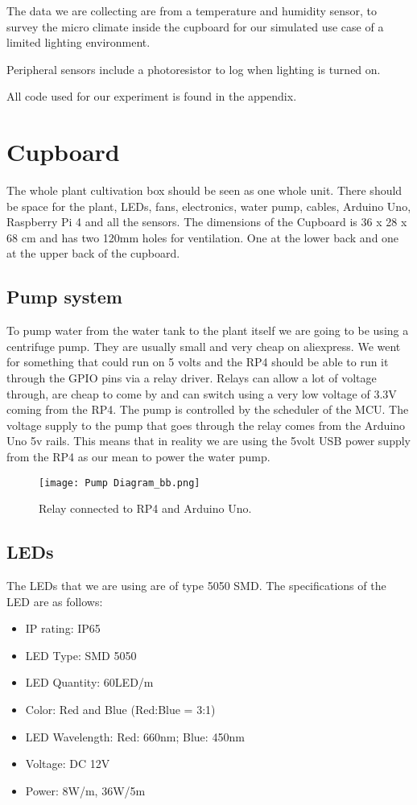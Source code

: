 \documentclass[12pt,a4paper,oneside]{book}
\begin{document}
The data we are collecting are from a temperature and humidity sensor, to survey the micro climate inside the cupboard for our simulated use case of a limited lighting environment.

Peripheral sensors include a photoresistor to log when lighting is turned on.

All code used for our experiment is found in the appendix.

\section{Cupboard}

The whole plant cultivation box should be seen as one whole unit. There should be space for the plant, LEDs, fans, electronics, water pump, cables, Arduino Uno, Raspberry Pi 4 and all the sensors.
The dimensions of the Cupboard is 36 x 28 x 68 cm and has two 120mm holes for ventilation. One at the lower back and one at the upper back of the cupboard.

\subsection{Pump system}
To pump water from the water tank to the plant itself we are going to be using a centrifuge pump. They are usually small and very cheap on aliexpress. We went for something that could run on 5 volts and the RP4 should be able to run it through the GPIO pins via a relay driver. Relays can allow a lot of voltage through, are cheap to come by and can switch using a very low voltage of 3.3V coming from the RP4. The pump is controlled by the scheduler of the MCU.
The voltage supply to the pump that goes through the relay comes from the Arduino Uno 5v rails. This means that in reality we are using the 5volt USB power supply from the RP4 as our mean to power the water pump.

\begin{figure}[h]
    \texttt{[image: Pump Diagram\_bb.png]}
    \caption{Relay connected to RP4 and Arduino Uno.}
    \label{LED_diagram}
\end{figure}

\subsection{LEDs}
The LEDs that we are using are of type 5050 SMD. The specifications of the LED are as follows:

\begin{itemize}
    \item IP rating: IP65
    \item LED Type: SMD 5050
    \item LED Quantity: 60LED/m 
    \item Color: Red and Blue (Red:Blue = 3:1)
    \item LED Wavelength: Red: 660nm; Blue: 450nm
    \item Voltage: DC 12V
    \item Power: 8W/m, 36W/5m
\end{itemize}
\end{document}
